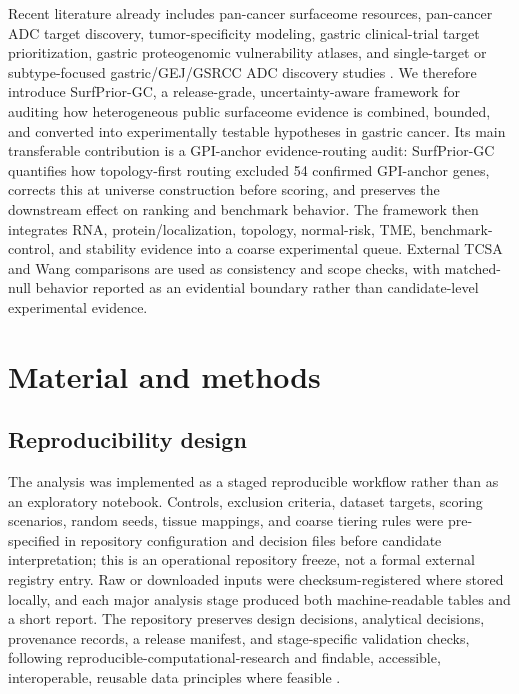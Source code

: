 \documentclass[preprint,12pt,authoryear]{elsarticle}
\begin{document}
Recent literature already includes pan-cancer surfaceome resources, pan-cancer ADC target discovery, tumor-specificity modeling, gastric clinical-trial target prioritization, gastric proteogenomic vulnerability atlases, and single-target or subtype-focused gastric/\allowbreak{}GEJ/\allowbreak{}GSRCC ADC discovery studies \citep{hu2021surfaceome,li2022pancancer,razzaghdoust2021adc,kathad2024adc,wang2026gastric,deng2024multiomics2targets,moek2017adc_landscape,li2024bayests,xu2025gastric_targets,chang2026gastric_proteogenomics,zhang2025cd66c,zhao2026pvr,li2026gastric_adc_review,katoh2025adhesion_adc,wang2025cdh17_adc}. We therefore introduce SurfPrior-GC, a release-grade, uncertainty-aware framework for auditing how heterogeneous public surfaceome evidence is combined, bounded, and converted into experimentally testable hypotheses in gastric cancer. Its main transferable contribution is a GPI-anchor evidence-routing audit: SurfPrior-GC quantifies how topology-first routing excluded 54 confirmed GPI-anchor genes, corrects this at universe construction before scoring, and preserves the downstream effect on ranking and benchmark behavior. The framework then integrates RNA, protein/\allowbreak{}localization, topology, normal-risk, TME, benchmark-control, and stability evidence into a coarse experimental queue. External TCSA and Wang comparisons are used as consistency and scope checks, with matched-null behavior reported as an evidential boundary rather than candidate-level experimental evidence.

\FloatBarrier
\section{Material and methods}

\subsection{Reproducibility design}

The analysis was implemented as a staged reproducible workflow rather than as an exploratory notebook. Controls, exclusion criteria, dataset targets, scoring scenarios, random seeds, tissue mappings, and coarse tiering rules were pre-specified in repository configuration and decision files before candidate interpretation;\allowbreak{} this is an operational repository freeze, not a formal external registry entry. Raw or downloaded inputs were checksum-registered where stored locally, and each major analysis stage produced both machine-readable tables and a short report. The repository preserves design decisions, analytical decisions, provenance records, a release manifest, and stage-specific validation checks, following reproducible-computational-research and findable, accessible, interoperable, reusable data principles where feasible \citep{sandve2013reproducible,wilkinson2016fair}.
\end{document}
